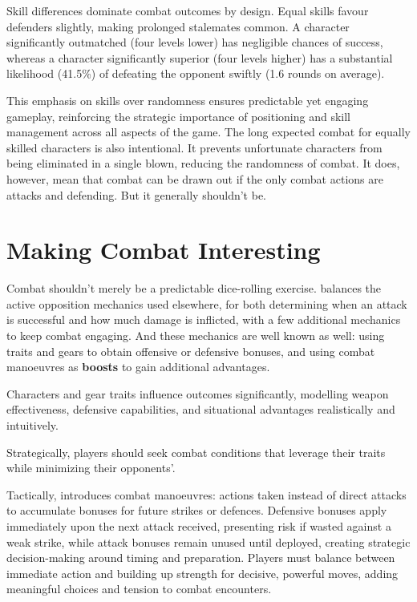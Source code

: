 
Skill differences dominate combat outcomes by design. Equal skills favour defenders slightly, making prolonged stalemates common. A character significantly outmatched (four levels lower) has negligible chances of success, whereas a character significantly superior (four levels higher) has a substantial likelihood (41.5\%) of defeating the opponent swiftly (1.6 rounds on average).

This emphasis on skills over randomness ensures predictable yet engaging gameplay, reinforcing the strategic importance of positioning and skill management across all aspects of the game. The long expected combat for equally skilled characters is also intentional. It prevents unfortunate characters from being eliminated in a single blown, reducing the randomness of combat. It does, however, mean that combat can be drawn out if the only combat actions are attacks and defending. But it generally shouldn't be.

\section{Making Combat Interesting}

Combat shouldn’t merely be a predictable dice-rolling exercise. \wyrd balances the active opposition mechanics used elsewhere, for both determining when an attack is successful and how much damage is inflicted, with a few additional mechanics to keep combat engaging. And these mechanics are well known as well: using traits and gears to obtain offensive or defensive bonuses, and using combat manoeuvres as \textbf{boosts} to gain additional advantages.

Characters and gear traits influence outcomes significantly, modelling weapon effectiveness, defensive capabilities, and situational advantages realistically and intuitively.

Strategically, players should seek combat conditions that leverage their traits while minimizing their opponents’.

Tactically, \wyrd introduces combat manoeuvres: actions taken instead of direct attacks to accumulate bonuses for future strikes or defences. Defensive bonuses apply immediately upon the next attack received, presenting risk if wasted against a weak strike, while attack bonuses remain unused until deployed, creating strategic decision-making around timing and preparation. Players must balance between immediate action and building up strength for decisive, powerful moves, adding meaningful choices and tension to combat encounters.

